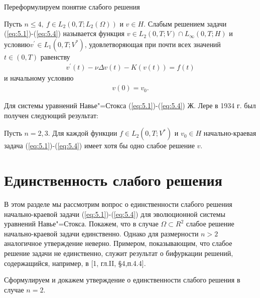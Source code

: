 Переформулируем понятие слабого решения
\begin{definition}
    Пусть $n \le 4, \ f \in L_2(0, T; L_2(\Omega))$ и $v \in H$. Слабым решением задачи (\ref{eq:5.1})-(\ref{eq:5.4}) называется функция
    $v \in L_2(0, T; V)\cap L_{\infty}(0,T;H)$ и условию$ v^{\prime}\in L_1(0, T; V^\ast)$, удовлетворяющая при почти всех значений $t \in (0, T)$ равенству
    \begin{equation}\label{eq:5.11}
        \begin{gathered}
            v^\prime(t) - \nu\Delta v(t) - K(v(t)) = f(t)
        \end{gathered}
    \end{equation}
    и начальному условию
    \begin{equation}\label{eq:5.12}
        \begin{gathered}
            v(0) = v_0.
        \end{gathered}
    \end{equation}
\end{definition}
Для системы уравнений Навье"=Стокса (\ref{eq:5.1})-(\ref{eq:5.4}) Ж. Лере в 1934 г. был получен следующий результат:
\begin{theorem}
Пусть $n=2,3$. Для каждой функции $f\in L_2(0,T;V^\ast)$ и $v_0\in H$ начально-краевая задача (\ref{eq:5.1})-(\ref{eq:5.4})
имеет хотя бы одно слабое решение $v.$
\end{theorem}
\clearpage

\section {Единственность слабого решения }
В этом разделе мы рассмотрим вопрос о единственности слабого решения начально-краевой задачи (\ref{eq:5.1})-(\ref{eq:5.4}) для эволюционной
системы уравнений Навье"=Стокса. Покажем, что в случае $\Omega \subset R^2$ слабое решение начально-краевой задачи единственно.
Однако для размерности $n > 2$ аналогичное утверждение неверно. Примером, показывающим, что слабое решение задачи не единственно, служит результат
о бифуркации решений, содержащийся, например, в [1, гл.II, \S 4,п.4.4].

Сформулируем и докажем утверждение о единственности слабого решения в случае $n = 2$.

